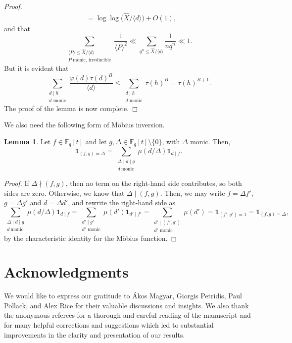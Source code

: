 \documentclass{article}
\theoremstyle{definition}
\newtheorem{lem}{Lemma}[section]
\theoremstyle{definition}
\theoremstyle{remark}
\newcommand{\F}{\mathbb{F}_q[t]}
\renewcommand\phi\varphi
\newcommand{\1}{\mathbf{1}}
\numberwithin{equation}{section}
\begin{document}
\begin{proof}
\begin{align*}
&=\log\log\big(\widehat{X}\slash \langle d \rangle\big)+ O(1),    
\end{align*}
and that
\[\sum_{\substack{\langle P\rangle \leq \widehat{X}\slash \langle d \rangle \\P\text{~monic, irreducible}}}\frac{1}{\langle P\rangle^2}\ll\sum_{q^n\le\widehat{X}\slash \langle d \rangle }\frac{1}{nq^n}\ll1.\]
But it is evident that
\[\sum_{\substack{d\mid h\\d\text{~monic}}}\frac{\phi(d)\tau(d)^B}{\langle d \rangle}\le\sum_{\substack{d\mid h\\d\text{~monic}}}\tau(h)^B=\tau(h)^{B+1}.\]
The proof of the lemma is now complete.
\end{proof}


We also need the following form of Möbius inversion.
\begin{lem}\label{Mobius}
Let $f\in \F$ and let $g,\Delta\in \F\setminus\{0\}$, with $\Delta$ monic. Then, 
\[\1_{(f,g)=\Delta}=\sum_{\substack{\Delta\mid d\mid g\\d~\text{monic}}}\mu(d\slash \Delta)\1_{d\mid f}.\]
\end{lem}
\begin{proof}
If $\Delta\nmid (f,g)$, then no term on the right-hand side contributes, so both sides are zero. Otherwise, we know that $\Delta\mid (f,g)$. Then, we may write $f=\Delta f'$, $g=\Delta g'$ and $d=\Delta d'$, and rewrite the right-hand side as 
\[\sum_{\substack{\Delta\mid d\mid g\\d~\text{monic}}}\mu(d\slash \Delta)\1_{d\mid f}=\sum_{\substack{d'\mid g'\\d'\text{~monic}}}\mu(d')\1_{d'\mid f'}=\sum_{\substack{d'\mid (f',g')\\d'\text{~monic}}}\mu(d')=\1_{(f',g')=1}=\1_{(f,g)=\Delta},\]
by the characteristic identity for the Möbius function. 

\end{proof}

\section{Acknowledgments} We would like to express our gratitude to Ákos Magyar, Giorgis Petridis, Paul Pollack, and Alex Rice for their valuable discussions and insights. We also thank the anonymous referees for a thorough and careful reading of the manuscript and for many helpful corrections and suggestions which led to substantial improvements in the clarity and presentation of our results.



\nocite{*}

\end{document}
